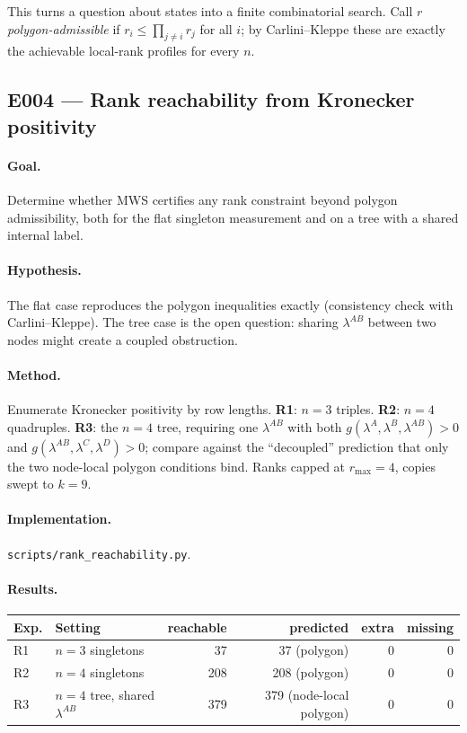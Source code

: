 \documentclass[11pt]{article}
\theoremstyle{definition}
\theoremstyle{remark}
\begin{document}
This turns a question about states into a finite combinatorial search. Call $r$
\emph{polygon-admissible} if $r_i \le \prod_{j \ne i} r_j$ for all $i$; by
Carlini--Kleppe \cite{CarliniKleppe2011} these are exactly the achievable local-rank
profiles for every $n$.

\subsection{E004 --- Rank reachability from Kronecker positivity}

\paragraph{Goal.}
Determine whether MWS certifies any rank constraint beyond polygon admissibility, both
for the flat singleton measurement and on a tree with a shared internal label.

\paragraph{Hypothesis.}
The flat case reproduces the polygon inequalities exactly (consistency check with
Carlini--Kleppe). The tree case is the open question: sharing $\lambda^{AB}$ between
two nodes might create a coupled obstruction.

\paragraph{Method.}
Enumerate Kronecker positivity by row lengths. \textbf{R1}: $n=3$ triples. \textbf{R2}:
$n=4$ quadruples. \textbf{R3}: the $n=4$ tree, requiring one $\lambda^{AB}$ with both
$g(\lambda^A,\lambda^B,\lambda^{AB}) > 0$ and $g(\lambda^{AB},\lambda^C,\lambda^D) > 0$;
compare against the ``decoupled'' prediction that only the two node-local polygon
conditions bind. Ranks capped at $r_{\max} = 4$, copies swept to $k = 9$.

\paragraph{Implementation.} \texttt{scripts/rank\_reachability.py}.

\paragraph{Results.}
{
\setlength{\tabcolsep}{8pt}
\renewcommand{\arraystretch}{1.2}
\begin{tabular}{llrrrr}
\toprule
Exp. & Setting & reachable & predicted & extra & missing \\
\midrule
R1 & $n=3$ singletons          & 37  & 37 (polygon)        & 0 & 0 \\
R2 & $n=4$ singletons          & 208 & 208 (polygon)       & 0 & 0 \\
R3 & $n=4$ tree, shared $\lambda^{AB}$ & 379 & 379 (node-local polygon) & 0 & 0 \\
\bottomrule
\end{tabular}
}
\end{document}

